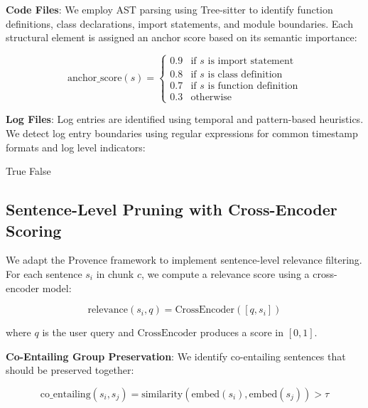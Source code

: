 \documentclass[conference]{IEEEtran}
\begin{document}
\textbf{Code Files}: We employ AST parsing using Tree-sitter \cite{tree-sitter} to identify function definitions, class declarations, import statements, and module boundaries. Each structural element is assigned an anchor score based on its semantic importance:

\begin{equation}
\text{anchor\_score}(s) = \begin{cases}
0.9 & \text{if } s \text{ is import statement} \\
0.8 & \text{if } s \text{ is class definition} \\
0.7 & \text{if } s \text{ is function definition} \\
0.3 & \text{otherwise}
\end{cases}
\end{equation}

\textbf{Log Files}: Log entries are identified using temporal and pattern-based heuristics. We detect log entry boundaries using regular expressions for common timestamp formats and log level indicators:

\begin{algorithmic}[1]
            \State \Return True
        \EndIf
    \EndFor
    \State \Return False
\EndProcedure
\end{algorithmic}

\subsection{Sentence-Level Pruning with Cross-Encoder Scoring}

We adapt the Provence framework \cite{provence2023} to implement sentence-level relevance filtering. For each sentence $s_i$ in chunk $c$, we compute a relevance score using a cross-encoder model:

\begin{equation}
\text{relevance}(s_i, q) = \text{CrossEncoder}([q, s_i])
\end{equation}

where $q$ is the user query and $\text{CrossEncoder}$ produces a score in $[0, 1]$.

\textbf{Co-Entailing Group Preservation}: We identify co-entailing sentences that should be preserved together:

\begin{equation}
\text{co\_entailing}(s_i, s_j) = \text{similarity}(\text{embed}(s_i), \text{embed}(s_j)) > \tau
\end{equation}
\end{document}
